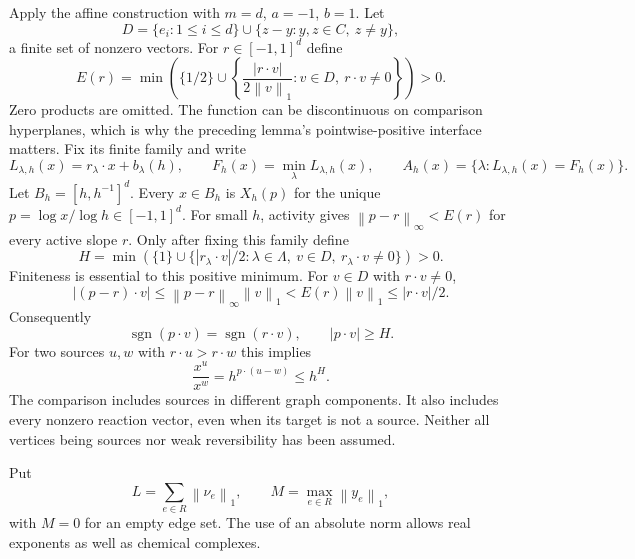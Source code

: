 \documentclass[11pt]{article}
\theoremstyle{definition}
\theoremstyle{remark}
\newcommand{\norm}[1]{\left\|#1\right\|}
\DeclareMathOperator{\sgn}{sgn}
\numberwithin{equation}{section}
\begin{document}
Apply the affine construction with $m=d$, $a=-1$, $b=1$. Let
\begin{equation}
 D=\{e_i:1\leq i\leq d\}\cup
       \{z-y:y,z\in C,\ z\ne y\},
 \label{eq:D}
\end{equation}
a finite set of nonzero vectors. For $r\in[-1,1]^d$ define
\begin{equation}
 E(r)=\min\left(\{1/2\}\cup
 \left\{\frac{|r\cdot v|}{2\norm{v}_1}:
             v\in D,\ r\cdot v\ne0\right\}\right)>0.
 \label{eq:E}
\end{equation}
Zero products are omitted. The function can be discontinuous
on comparison hyperplanes, which is why the preceding lemma's
pointwise-positive interface matters. Fix its finite family and
write
\[
 L_{\lambda,h}(x)=r_\lambda\cdot x+b_\lambda(h),\qquad
 F_h(x)=\min_\lambda L_{\lambda,h}(x),\qquad
 A_h(x)=\{\lambda:L_{\lambda,h}(x)=F_h(x)\}.
\]
Let $B_h=[h,h^{-1}]^d$. Every $x\in B_h$ is $X_h(p)$ for the
unique $p=\log x/\log h\in[-1,1]^d$. For small $h$, activity
gives $\norm{p-r}_\infty<E(r)$ for every active slope $r$.
Only after fixing this family define
\begin{equation}
 H=\min\left(\{1\}\cup
 \{|r_\lambda\cdot v|/2:\lambda\in\Lambda,\ v\in D,
                                      \ r_\lambda\cdot v\ne0\}\right)>0.
 \label{eq:H}
\end{equation}
Finiteness is essential to this positive minimum. For $v\in D$
with $r\cdot v\ne0$,
\[
 |(p-r)\cdot v|\leq\norm{p-r}_\infty\norm{v}_1
       < E(r)\norm{v}_1\leq |r\cdot v|/2.
\]
Consequently
\begin{equation}
 \sgn(p\cdot v)=\sgn(r\cdot v),\qquad |p\cdot v|\geq H.
 \label{eq:sign}
\end{equation}
For two sources $u,w$ with $r\cdot u>r\cdot w$ this implies
\begin{equation}
 \frac{x^u}{x^w}=h^{p\cdot(u-w)}\leq h^H.
 \label{eq:ratio}
\end{equation}
The comparison includes sources in different graph components.
It also includes every nonzero reaction vector, even when its
target is not a source. Neither all vertices being sources nor
weak reversibility has been assumed.

Put
\begin{equation}
 L=\sum_{e\in R}\norm{\nu_e}_1,\qquad
 M=\max_{e\in R}\norm{y_e}_1,
 \label{eq:LM}
\end{equation}
with $M=0$ for an empty edge set. The use of an absolute norm
allows real exponents as well as chemical complexes.
\end{document}
